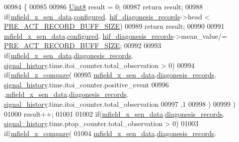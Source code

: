 \begin{DoxyCode}
00984                                   \{
00985 
00986     \hyperlink{a00072_af84840501dec18061d18a68c162a8fa2}{Uint8} result = 0;
00987 \textcolor{keywordflow}{return} result;
00988     \textcolor{keywordflow}{if}(\hyperlink{a00052_af8c531b1ba5fea148fb9111e06058f92}{mfield\_x\_sen\_data}.\hyperlink{a00025_a94b2d1f6ea4ab334c74d24984dd27843}{configured}.
      \hyperlink{a00021_ae18294f7499d9fcb5ec796a1816b8cd8}{hif\_diagonesis\_records}->head < \hyperlink{a00022_a18dcecc16ded13fa622e0913e73442e6}{PRE\_ACT\_RECORD\_BUFF\_SIZE})
00989         \textcolor{keywordflow}{return} result;
00990 
00991     \hyperlink{a00052_af8c531b1ba5fea148fb9111e06058f92}{mfield\_x\_sen\_data}.\hyperlink{a00025_a94b2d1f6ea4ab334c74d24984dd27843}{configured}.
      \hyperlink{a00021_ae18294f7499d9fcb5ec796a1816b8cd8}{hif\_diagonesis\_records}->mean\_value/=
      \hyperlink{a00022_a18dcecc16ded13fa622e0913e73442e6}{PRE\_ACT\_RECORD\_BUFF\_SIZE};
00992 
00993     \textcolor{keywordflow}{if}(\hyperlink{a00052_af8c531b1ba5fea148fb9111e06058f92}{mfield\_x\_sen\_data}.\hyperlink{a00025_a2bd79ce84bbd6b7f50d38954f7ae475e}{diagonesis\_records}.
      \hyperlink{a00019_ab7038f4de1f77b52a7f89e9f77c0b846}{signal\_history}.time.itoi\_counter.total\_observation > 0)
00994     \textcolor{keywordflow}{if}(\hyperlink{a00052_adf290c10214480d55f3631c1760188b0}{mfield\_x\_compare}(
00995             \hyperlink{a00052_af8c531b1ba5fea148fb9111e06058f92}{mfield\_x\_sen\_data}.\hyperlink{a00025_a2bd79ce84bbd6b7f50d38954f7ae475e}{diagonesis\_records}.
      \hyperlink{a00019_ab7038f4de1f77b52a7f89e9f77c0b846}{signal\_history}.time.itoi\_counter.positive\_event
00996            ,\hyperlink{a00052_af8c531b1ba5fea148fb9111e06058f92}{mfield\_x\_sen\_data}.\hyperlink{a00025_a2bd79ce84bbd6b7f50d38954f7ae475e}{diagonesis\_records}.
      \hyperlink{a00019_ab7038f4de1f77b52a7f89e9f77c0b846}{signal\_history}.time.itoi\_counter.total\_observation
00997            ,1
00998             )
00999            )
01000         result++;
01001 
01002     \textcolor{keywordflow}{if}(\hyperlink{a00052_af8c531b1ba5fea148fb9111e06058f92}{mfield\_x\_sen\_data}.\hyperlink{a00025_a2bd79ce84bbd6b7f50d38954f7ae475e}{diagonesis\_records}.
      \hyperlink{a00019_ab7038f4de1f77b52a7f89e9f77c0b846}{signal\_history}.time.ptop\_counter.total\_observation > 0)
01003     \textcolor{keywordflow}{if}(\hyperlink{a00052_adf290c10214480d55f3631c1760188b0}{mfield\_x\_compare}(
01004           \hyperlink{a00052_af8c531b1ba5fea148fb9111e06058f92}{mfield\_x\_sen\_data}.\hyperlink{a00025_a2bd79ce84bbd6b7f50d38954f7ae475e}{diagonesis\_records}.

\end{DoxyCode}

